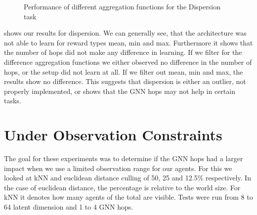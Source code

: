 \begin{figure}[htp]
    \centering
    \hspace{1cm}                       
    \caption{Performance of different aggregation functions for the Dispersion task}
    \label{fig:aggregation-compare}
\end{figure}

 shows our results for dispersion. We can generally see, that the architecture was not able to learn for reward types mean, min and max. Furthermore it shows that the number of hops did not make any difference in learning. If we filter for the difference aggregation functions we either observed no difference in the number of hops, or the setup did not learn at all. If we filter out mean, min and max, the results show no difference. This suggests that dispersion is either an outlier, not properly implemented, or shows that the GNN hops may not help in certain tasks. 


\section{Under Observation Constraints}
\label{sec:Under Observation Constraints}
The goal for these experiments was to determine if the GNN hops had a larger impact when we use a limited observation range for our agents. For this we looked at kNN and euclidean distance culling of 50, 25 and 12.5$\%$ respectively. In the case of euclidean distance, the percentage is relative to the world size. For kNN it denotes how many agents of the total are visible. Tests were run from 8 to 64 latent dimension and 1 to 4 GNN hops.

